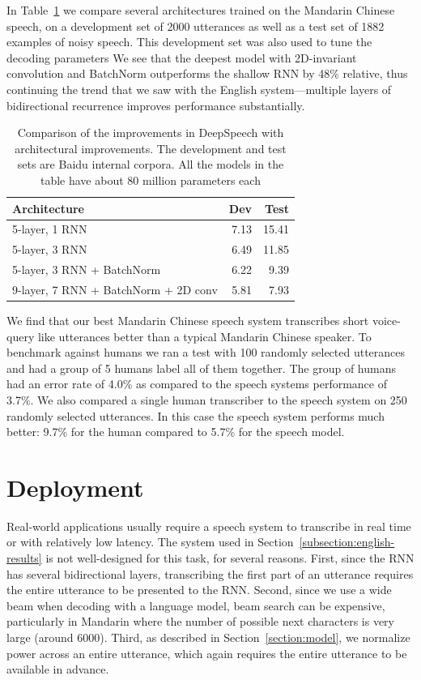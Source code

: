 \documentclass{article}
\begin{document}
In Table~\ref{table:results-mandarin} we compare several architectures trained on the Mandarin Chinese speech, on a development set of 2000 utterances as well as a test set of 1882 examples of noisy speech. This development set was also used to tune the decoding parameters
We see that the deepest model with 2D-invariant convolution and BatchNorm outperforms the shallow RNN by 48\% relative, thus continuing the trend that we saw with the English system---multiple layers of bidirectional recurrence improves performance substantially. 

\begin{table}[ht!]
\centering
\begin{tabular}{l  r  r  }
\toprule
Architecture & Dev & Test \\
\midrule
5-layer, 1 RNN                & 7.13  & 15.41 \\
5-layer, 3 RNN                & 6.49  & 11.85 \\
5-layer, 3 RNN + BatchNorm           & 6.22  & 9.39 \\
9-layer, 7 RNN + BatchNorm + 2D conv & 5.81  & 7.93 \\
\bottomrule
\end{tabular}
\caption{Comparison of the improvements in DeepSpeech with architectural improvements. The development and test sets are Baidu internal corpora. All the models in the table have about 80 million parameters each}
\label{table:results-mandarin}
\end{table}

We find that our best Mandarin Chinese speech system transcribes short voice-query like utterances better than a typical Mandarin Chinese speaker. To benchmark against humans we ran a test with 100 randomly selected utterances and had a group of 5 humans label all of them together. The group of humans had an error rate of 4.0\% as compared to the speech systems performance of 3.7\%. We also compared a single human transcriber to the speech system on 250 randomly selected utterances. In this case the speech system performs much better: 9.7\% for the human compared to 5.7\% for the speech model.

\section{Deployment}
\label{section:deployment}

Real-world applications usually require a speech system to transcribe in real time or with relatively low latency. The system used in Section~\ref{subsection:english-results} is not well-designed for this task, for several reasons. First, since the RNN has several bidirectional layers, transcribing the first part of an utterance requires the entire utterance to be presented to the RNN. Second, since we use a wide beam when decoding with a language model, beam search can be expensive, particularly in Mandarin where the number of possible next characters is very large (around 6000). Third, as described in Section~\ref{section:model}, we normalize power across an entire utterance, which again requires the entire utterance to be available in advance.
\end{document}
